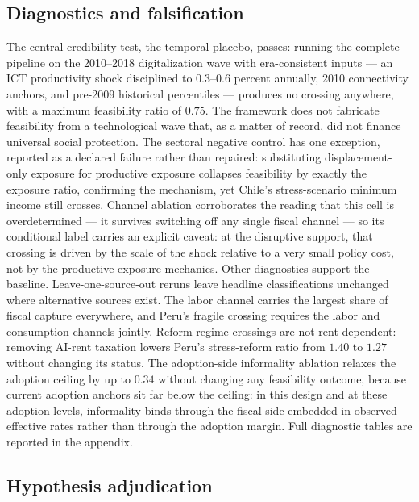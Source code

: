 \documentclass[11pt,a4paper]{article}
\begin{document}



\subsection{Diagnostics and falsification}\label{subsec:results_diagnostics}

The central credibility test, the temporal placebo, passes: running the complete pipeline
on the 2010--2018 digitalization wave with era-consistent inputs --- an ICT
productivity shock disciplined to $0.3$--$0.6$ percent annually, 2010 connectivity anchors,
and pre-2009 historical percentiles --- produces no crossing anywhere, with a maximum
feasibility ratio of $0.75$. The framework does not fabricate feasibility from a
technological wave that, as a matter of record, did not finance universal social protection.
The sectoral negative control has one exception, reported as a declared failure rather than
repaired: substituting displacement-only exposure for
productive exposure collapses feasibility by exactly the exposure ratio, confirming the
mechanism, yet Chile's stress-scenario minimum income still crosses. Channel ablation
corroborates the reading that this cell is overdetermined --- it survives switching off any
single fiscal channel --- so its conditional label carries an explicit caveat: at the
disruptive support, that crossing is driven by the scale of the shock relative to a very
small policy cost, not by the productive-exposure mechanics. Other diagnostics support the
baseline. Leave-one-source-out reruns leave headline classifications
unchanged where alternative sources exist. The labor channel carries the largest share of
fiscal capture everywhere, and Peru's fragile crossing requires the labor and consumption
channels jointly. Reform-regime crossings are not rent-dependent: removing AI-rent taxation
lowers Peru's stress-reform ratio from $1.40$ to $1.27$ without changing its status.
The adoption-side informality ablation relaxes the adoption ceiling by up to
$0.34$ without changing any feasibility outcome, because current adoption anchors sit far
below the ceiling: in this design and at these adoption levels, informality binds through
the fiscal side embedded in observed effective rates rather than through the adoption
margin. Full diagnostic tables are reported in the appendix.
\subsection{Hypothesis adjudication}\label{subsec:results_adjudication}
\end{document}

